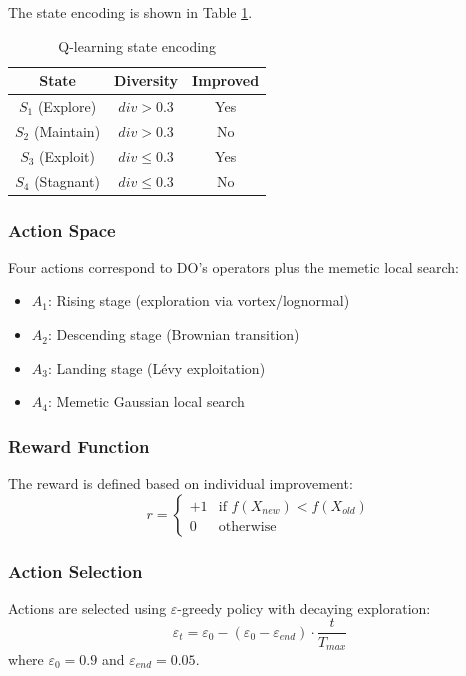 \documentclass[preprint,12pt]{elsarticle}
\begin{document}
The state encoding is shown in Table \ref{tab:states}.

\begin{table}[htbp]
\centering
\caption{Q-learning state encoding}
\label{tab:states}
\begin{tabular}{ccc}
\toprule
\textbf{State} & \textbf{Diversity} & \textbf{Improved} \\
\midrule
$S_1$ (Explore) & $div > 0.3$ & Yes \\
$S_2$ (Maintain) & $div > 0.3$ & No \\
$S_3$ (Exploit) & $div \leq 0.3$ & Yes \\
$S_4$ (Stagnant) & $div \leq 0.3$ & No \\
\bottomrule
\end{tabular}
\end{table}

\subsubsection{Action Space}
Four actions correspond to DO's operators plus the memetic local search:
\begin{itemize}
    \item $A_1$: Rising stage (exploration via vortex/lognormal)
    \item $A_2$: Descending stage (Brownian transition)
    \item $A_3$: Landing stage (Lévy exploitation)
    \item $A_4$: Memetic Gaussian local search
\end{itemize}

\subsubsection{Reward Function}
The reward is defined based on individual improvement:
\begin{equation}
r = \begin{cases} +1 & \text{if } f(X_{new}) < f(X_{old}) \\ 0 & \text{otherwise} \end{cases}
\label{eq:reward}
\end{equation}

\subsubsection{Action Selection}
Actions are selected using $\varepsilon$-greedy policy with decaying exploration:
\begin{equation}
\varepsilon_t = \varepsilon_0 - (\varepsilon_0 - \varepsilon_{end}) \cdot \frac{t}{T_{max}}
\label{eq:epsilon_decay}
\end{equation}
where $\varepsilon_0 = 0.9$ and $\varepsilon_{end} = 0.05$.
\end{document}
